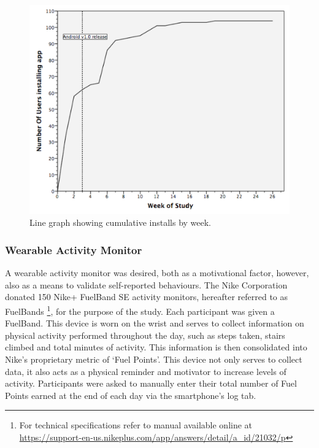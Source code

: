 \begin{figure}[h]
    \centering
    \includegraphics[scale=0.25, angle=0]{Files/prevention-study-3/figures/installs-by-week}
    \caption{Line graph showing cumulative installs by week.}
    \label{fig: number-installs}
\end{figure}

\subsubsection{Wearable Activity Monitor}
A wearable activity monitor was desired, both as a motivational factor, however, also as a means to validate self-reported behaviours. The Nike Corporation donated 150 Nike+ FuelBand SE activity monitors, hereafter referred to as FuelBands \footnote{For technical specifications refer to manual available online at \url{https://support-en-us.nikeplus.com/app/answers/detail/a_id/21032/p}}, for the purpose of the study. Each participant was given a FuelBand. This device is worn on the wrist and serves to collect information on physical activity performed throughout the day, such as steps taken, stairs climbed and total minutes of activity. This information is then consolidated into Nike's proprietary metric of ‘Fuel Points’. This device not only serves to collect data, it also acts as a physical reminder and motivator to increase levels of activity. Participants were asked to manually enter their total number of Fuel Points earned at the end of each day via the smartphone’s log tab.

